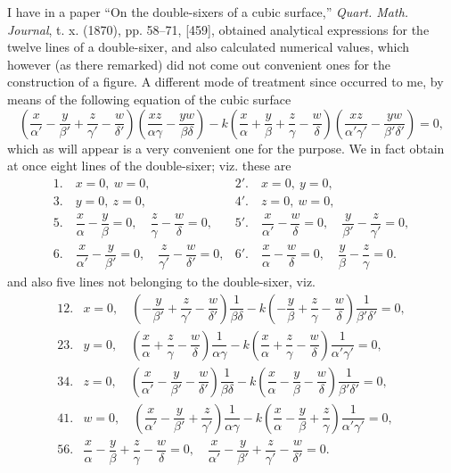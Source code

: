 \documentclass[11pt,a4paper]{article}
\begin{document}
I have in a paper ``On the double-sixers of a cubic surface,'' \textit{Quart. Math.
Journal}, t. x. (1870), pp. 58--71, [459], obtained analytical expressions for the
twelve lines of a double-sixer, and also calculated numerical values, which however
(as there remarked) did not come out convenient ones for the construction of a figure.
A different mode of treatment since occurred to me, by means of the following equation
of the cubic surface
\[
\left(\frac{x}{\alpha'}-\frac{y}{\beta'}+\frac{z}{\gamma'}-\frac{w}{\delta'}\right)
\left(\frac{xz}{\alpha\gamma}-\frac{yw}{\beta\delta}\right)
-k\left(\frac{x}{\alpha}+\frac{y}{\beta}+\frac{z}{\gamma}-\frac{w}{\delta}\right)
\left(\frac{xz}{\alpha'\gamma'}-\frac{yw}{\beta'\delta'}\right)=0,
\]
which as will appear is a very convenient one for the purpose. We in fact obtain at
once eight lines of the double-sixer; viz. these are
\[
\begin{array}{ll}
1.\quad x=0,\ w=0, & 2'.\quad x=0,\ y=0,\\
3.\quad y=0,\ z=0, & 4'.\quad z=0,\ w=0,\\
5.\quad \dfrac{x}{\alpha}-\dfrac{y}{\beta}=0,\quad
       \dfrac{z}{\gamma}-\dfrac{w}{\delta}=0,
&
5'.\quad \dfrac{x}{\alpha'}-\dfrac{w}{\delta}=0,\quad
       \dfrac{y}{\beta'}-\dfrac{z}{\gamma'}=0,\\
6.\quad \dfrac{x}{\alpha'}-\dfrac{y}{\beta'}=0,\quad
       \dfrac{z}{\gamma'}-\dfrac{w}{\delta'}=0,
&
6'.\quad \dfrac{x}{\alpha}-\dfrac{w}{\delta}=0,\quad
       \dfrac{y}{\beta}-\dfrac{z}{\gamma}=0.
\end{array}
\]
and also five lines not belonging to the double-sixer, viz.
\[
\begin{array}{rl}
12.& x=0,\quad
\left(-\dfrac{y}{\beta'}+\dfrac{z}{\gamma'}-\dfrac{w}{\delta'}\right)\dfrac1{\beta\delta}
-k\left(-\dfrac{y}{\beta}+\dfrac{z}{\gamma}-\dfrac{w}{\delta}\right)\dfrac1{\beta'\delta'}=0,\\[2mm]
23.& y=0,\quad
\left(\dfrac{x}{\alpha}+\dfrac{z}{\gamma}-\dfrac{w}{\delta}\right)\dfrac1{\alpha\gamma}
-k\left(\dfrac{x}{\alpha}+\dfrac{z}{\gamma}-\dfrac{w}{\delta}\right)\dfrac1{\alpha'\gamma'}=0,\\[2mm]
34.& z=0,\quad
\left(\dfrac{x}{\alpha'}-\dfrac{y}{\beta'}-\dfrac{w}{\delta'}\right)\dfrac1{\beta\delta}
-k\left(\dfrac{x}{\alpha}-\dfrac{y}{\beta}-\dfrac{w}{\delta}\right)\dfrac1{\beta'\delta'}=0,\\[2mm]
41.& w=0,\quad
\left(\dfrac{x}{\alpha'}-\dfrac{y}{\beta'}+\dfrac{z}{\gamma'}\right)\dfrac1{\alpha\gamma}
-k\left(\dfrac{x}{\alpha}-\dfrac{y}{\beta}+\dfrac{z}{\gamma}\right)\dfrac1{\alpha'\gamma'}=0,\\[2mm]
56.& \dfrac{x}{\alpha}-\dfrac{y}{\beta}+\dfrac{z}{\gamma}-\dfrac{w}{\delta}=0,\quad
\dfrac{x}{\alpha'}-\dfrac{y}{\beta'}+\dfrac{z}{\gamma'}-\dfrac{w}{\delta'}=0.
\end{array}
\]
\end{document}

